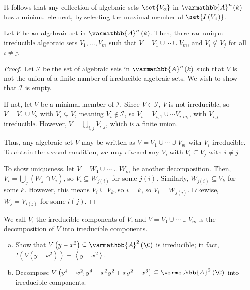\documentclass[10pt]{mypackage}
\renewcommand*{\mathbb}[1]{\varmathbb{#1}}
\newcommand{\A}{\mathbb{A}}
\begin{document}
It follows that any collection of algebraic sets $\set{V_{\alpha}}$ in $\A^n\left( k \right)$ has a minimal element, by selecting the maximal member of $\set{I\left( V_{\alpha} \right)}$.
\begin{theorem}
  Let $V$ be an algebraic set in $\A^n\left( k \right)$. Then, there rae unique irreducible algebraic sets $V_1,\dots,V_m$ such that $V=  V_1\cup \cdots \cup V_m$, and $V_i\nsubseteq V_j$ for all $i\neq j$.
\end{theorem}
\begin{proof}
  Let $\mathcal{I}$ be the set of algebraic sets in $\A^n\left( k \right)$ such that $V$ is not the union of a finite number of irreducible algebraic sets. We wish to show that $\mathcal{I}$ is empty.\newline

  If not, let $V$ be a minimal member of $\mathcal{I}$. Since $V\in \mathcal{I}$, $V$ is not irreducible, so $V = V_1\cup V_2$ with $V_i\subsetneq V$, meaning $V_i\notin \mathcal{I}$, so $V_i = V_{i,1}\cup\cdots V_{i,m_i}$, with $V_{i,j}$ irreducible. However, $V = \bigcup_{i,j} V_{i,j}$, which is a finite union.\newline

  Thus, any algebraic set $V$ may be written as $V = V_1\cup\cdots\cup V_m$ with $V_i$ irreducible. To obtain the second condition, we may discard any $V_i$ with $V_i\subseteq V_j$ with $i\neq j$.\newline

  To show uniqueness, let $V = W_1\cup\cdots\cup W_m$ be another decomposition. Then, $V_i= \bigcup_{j}\left( W_j\cap V_i \right)$, so $V_i\subseteq W_{j(i)}$ for some $j(i)$. Similarly, $W_{j(i)}\subseteq V_k$ for some $k$. However, this means $V_i\subseteq V_k$, so $i = k$, so $V_i = W_{j(i)}$. Likewise, $W_j = V_{i(j)}$ for some $i(j)$.
\end{proof}
We call $V_i$ the irreducible components of $V$, and $V = V_1\cup\cdots\cup V_m$ is the decomposition of $V$ into irreducible components.
\begin{exercise}[Exercise 1.25]\hfill
  \begin{enumerate}[(a)]
    \item Show that $V\left(y-x^2\right)\subseteq \A^2\left(\C\right)$ is irreducible; in fact, $I\left(V\left(y-x^2\right)\right) = \left\langle y-x^2 \right\rangle$.
    \item Decompose $V\left( y^4-x^2,y^4-x^2y^2+xy^2-x^3 \right)\subseteq \A^2\left( \C \right)$ into irreducible components.
  \end{enumerate}
\end{exercise}
\end{document}
